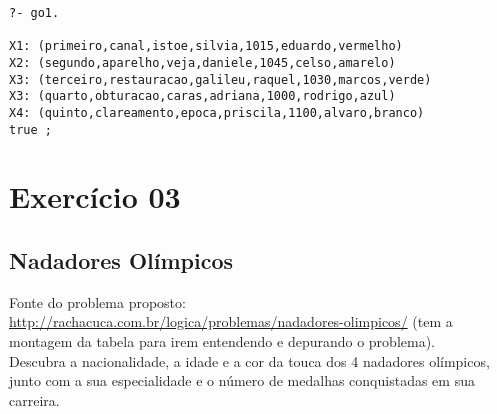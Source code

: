 \documentclass[final,a4paper]{article}
\begin{document}
\begin{verbatim}
?- go1.

X1: (primeiro,canal,istoe,silvia,1015,eduardo,vermelho)
X2: (segundo,aparelho,veja,daniele,1045,celso,amarelo)
X3: (terceiro,restauracao,galileu,raquel,1030,marcos,verde)
X3: (quarto,obturacao,caras,adriana,1000,rodrigo,azul)
X4: (quinto,clareamento,epoca,priscila,1100,alvaro,branco)
true ;
\end{verbatim}


\section{Exercício 03}

\subsection{Nadadores Olímpicos}

 Fonte do problema proposto:
  \url{http://rachacuca.com.br/logica/problemas/nadadores-olimpicos/} (tem a montagem da tabela para irem entendendo e depurando o problema).\\

Descubra a nacionalidade, a idade e a cor da touca dos 4 nadadores olímpicos, junto com a sua especialidade e o número de medalhas conquistadas em sua carreira.
\end{document}
